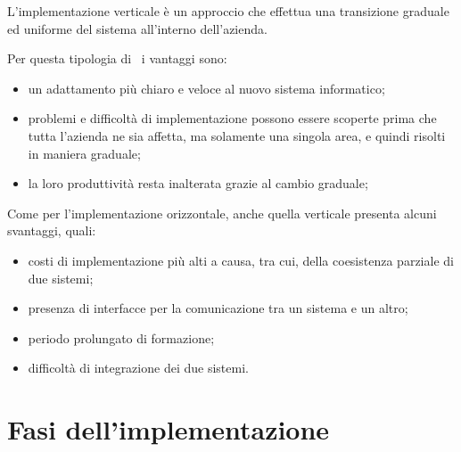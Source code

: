 	L'implementazione verticale è un approccio che effettua una transizione graduale ed uniforme del sistema all'interno dell'azienda.
	
	Per questa tipologia di \rollout~i vantaggi sono:
	\begin{itemize}[noitemsep]
		\renewcommand\labelitemi{--}
		\item un adattamento più chiaro e veloce al nuovo sistema informatico;
		\item problemi e difficoltà di implementazione possono essere scoperte prima che tutta l'azienda ne sia affetta, ma solamente una singola area, e quindi risolti in maniera graduale;
		\item la loro produttività resta inalterata grazie al cambio graduale;
	\end{itemize}

	Come per l'implementazione orizzontale, anche quella verticale presenta alcuni svantaggi, quali:
	\begin{itemize}[noitemsep]
		\renewcommand\labelitemi{--}
		\item costi di implementazione più alti a causa, tra cui, della coesistenza parziale di due sistemi;
		\item presenza di interfacce per la comunicazione tra un sistema e un altro;
		\item periodo prolungato di formazione;
		\item difficoltà di integrazione dei due sistemi.
	\end{itemize}

\section{Fasi dell'implementazione}

